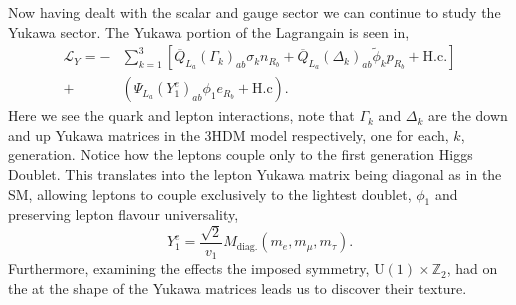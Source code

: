 Now having dealt with the scalar and gauge sector we can continue to study the Yukawa sector. 
%
The Yukawa portion of the Lagrangain is seen in,
\begin{equation} \label{eq:3HDM_Yuk} \begin{split} 
\mathcal{L}_Y = - & \sum_{k=1}^3 \left[ \overline{Q}_{L_a} \left( \Gamma_k \right)_{ab} \sigma_k n_{R_b} + \overline{Q}_{L_a} \left( \Delta_k \right)_{ab} \tilde{\phi}_k p_{R_b} + \text{H.c}.  \right] \\ + & \left( \Psi_{L_a} \left( Y^e_1 \right)_{ab} \phi_1 e_{R_b} + \text{H.c} \right) .
\end{split} \end{equation} 
Here we see the quark and lepton interactions, note that $\Gamma_k$ and $\Delta_k$ are the down and up Yukawa matrices in the 3HDM model respectively, one for each, $k$, generation.
%
Notice how the leptons couple only to the first generation Higgs Doublet. 
%
This translates into the lepton Yukawa matrix being diagonal as in the SM, allowing leptons to couple exclusively to the lightest doublet, $\phi_1$ and preserving lepton flavour universality, 
%
\begin{equation}
Y^e_1 = \frac{\sqrt{2}}{v_1} M_{\text{diag.}}\left( m_e , m_\mu , m_\tau \right) .
\end{equation} 
%
%
Furthermore, examining the effects the imposed symmetry, $\mathrm{U}(1)\times\mathbb{Z}_2$, had on the at the shape of the Yukawa matrices leads us to discover their texture.  
%
